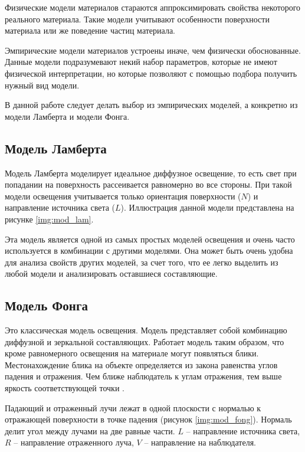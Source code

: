 Физические модели материалов стараются аппроксимировать свойства некоторого реального материала. Такие модели учитывают особенности поверхности материала или же поведение частиц материала.

Эмпирические модели материалов устроены иначе, чем физически обоснованные. Данные модели подразумевают некий набор параметров, которые не имеют физической интерпретации, но которые позволяют с помощью подбора получить нужный вид модели.

В данной работе следует делать выбор из эмпирических моделей, а конкретно из модели Ламберта и модели Фонга.

\subsection{Модель Ламберта}

Модель Ламберта \cite{lamber_fong} моделирует идеальное диффузное освещение, то есть свет при попадании на поверхность рассеивается равномерно во все стороны. При такой модели освещения учитывается только ориентация поверхности ($N$) и направление источника света ($L$). Иллюстрация данной модели представлена на рисунке \ref{img:mod_lam}.


Эта модель является одной из самых простых моделей освещения и очень часто используется в комбинации с другими моделями. Она может быть очень удобна для анализа свойств других моделей, за счет того, что ее легко выделить из любой модели и анализировать оставшиеся составляющие.

\subsection{Модель Фонга}

Это классическая модель освещения. Модель представляет собой комбинацию диффузной и зеркальной составляющих. Работает модель таким образом, что кроме равномерного освещения на материале могут появляться блики. Местонахождение блика на объекте определяется из закона равенства углов падения и отражения. Чем ближе наблюдатель к углам отражения, тем выше яркость соответствующей точки \cite{lamber_fong}.


Падающий и отраженный лучи лежат в одной плоскости с нормалью к отражающей поверхности в точке падения (рисунок \ref{img:mod_fong}). Нормаль делит угол между лучами на две равные части. $L$ – направление источника света, $R$ – направление отраженного луча, $V$ – направление на наблюдателя.

